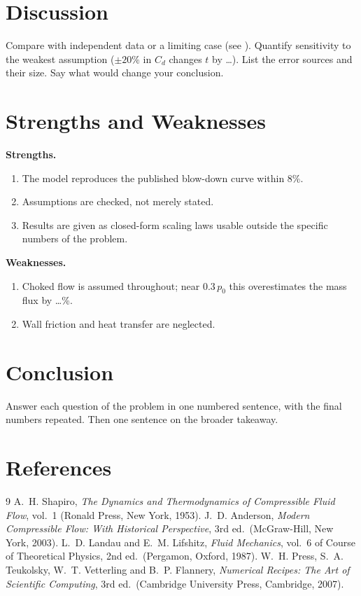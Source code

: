 \documentclass[12pt,letterpaper]{article}
\begin{document}
\section{Discussion}
\label{sec:discussion}
Compare with independent data or a limiting case (see \cite{shapiro1953,landau1987}). Quantify sensitivity to the
weakest assumption ($\pm20\%$ in $C_d$ changes $t$ by \ldots). List the error
sources and their size. Say what would change your conclusion.

\section{Strengths and Weaknesses}
\label{sec:sw}
\textbf{Strengths.}
\begin{enumerate}[label=(\arabic*)]
  \item The model reproduces the published blow-down curve within 8\%.
  \item Assumptions are checked, not merely stated.
  \item Results are given as closed-form scaling laws usable outside the
        specific numbers of the problem.
\end{enumerate}
\textbf{Weaknesses.}
\begin{enumerate}[label=(\arabic*)]
  \item Choked flow is assumed throughout; near $0.3\,p_0$ this overestimates
        the mass flux by \ldots\%.
  \item Wall friction and heat transfer are neglected.
\end{enumerate}

\section{Conclusion}
\label{sec:conclusion}
Answer each question of the problem in one numbered sentence, with the final
numbers repeated. Then one sentence on the broader takeaway.

\section*{References}
\begin{thebibliography}{9}
 A.~H. Shapiro, \emph{The Dynamics and Thermodynamics of
Compressible Fluid Flow}, vol.~1 (Ronald Press, New York, 1953).
 J.~D. Anderson, \emph{Modern Compressible Flow: With
Historical Perspective}, 3rd ed.\ (McGraw-Hill, New York, 2003).
 L.~D. Landau and E.~M. Lifshitz, \emph{Fluid Mechanics},
vol.~6 of Course of Theoretical Physics, 2nd ed.\ (Pergamon, Oxford, 1987).
 W.~H. Press, S.~A. Teukolsky, W.~T. Vetterling and
B.~P. Flannery, \emph{Numerical Recipes: The Art of Scientific Computing},
3rd ed.\ (Cambridge University Press, Cambridge, 2007).
\end{thebibliography}
\end{document}
